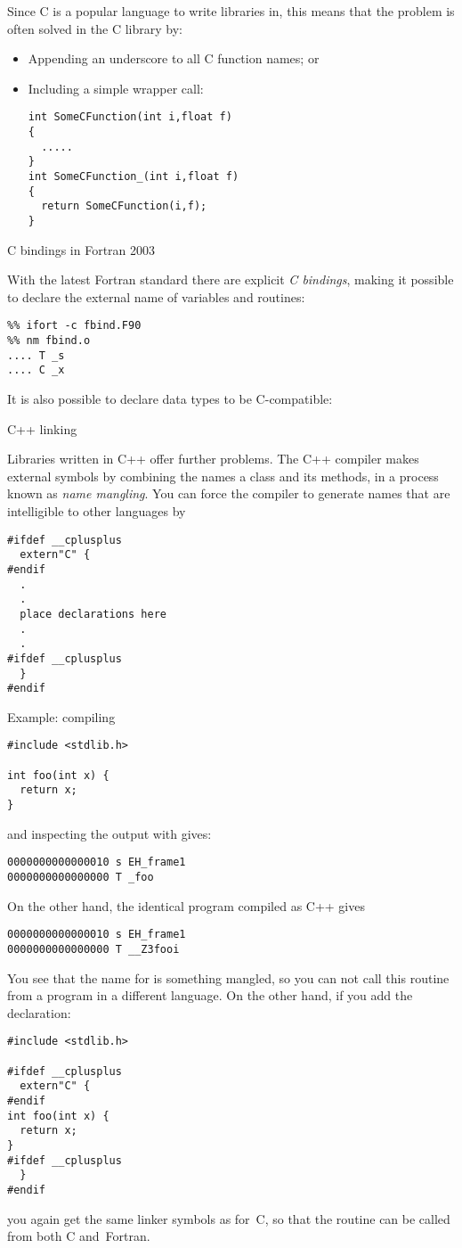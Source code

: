 Since C is a popular language to write libraries in, this means
that the problem is often solved in the C library by:
\begin{itemize}
\item Appending an underscore to all C function names; or
\item Including a simple wrapper call:
\begin{verbatim}
int SomeCFunction(int i,float f)
{
  .....
}
int SomeCFunction_(int i,float f)
{
  return SomeCFunction(i,f);
}
\end{verbatim}
\end{itemize}

 {C bindings in Fortran 2003}
 
With the latest Fortran standard there are explicit
\emph{C bindings},
making
it possible to declare the
external name of variables and routines:

\begin{verbatim}
%% ifort -c fbind.F90
%% nm fbind.o
.... T _s
.... C _x
\end{verbatim}

It is also possible to declare data types to be C-compatible:


 {C++ linking}

Libraries written in C++ offer further problems.
The C++ compiler makes external symbols by combining
the names a class and its methods, in a process known
as \emph{name mangling}.
You can force the compiler to
generate names that are intelligible to other languages by
\begin{verbatim}
#ifdef __cplusplus
  extern"C" {
#endif
  .
  .
  place declarations here
  .
  .
#ifdef __cplusplus
  }
#endif
\end{verbatim}

Example:
compiling
\begin{verbatim}
#include <stdlib.h>

int foo(int x) {
  return x;
}
\end{verbatim}
and inspecting the output with  gives:
\begin{verbatim}
0000000000000010 s EH_frame1
0000000000000000 T _foo
\end{verbatim}
On the other hand, the identical program compiled as C++ gives
\begin{verbatim}
0000000000000010 s EH_frame1
0000000000000000 T __Z3fooi
\end{verbatim}
You see that the name for  is something mangled, so you can not call 
this routine from a program in a different language. On the other hand,
if you add the  declaration:
\begin{verbatim}
#include <stdlib.h>

#ifdef __cplusplus
  extern"C" {
#endif
int foo(int x) {
  return x;
}
#ifdef __cplusplus
  }
#endif
\end{verbatim}
you again get the same linker symbols as for~C, so that the routine
can be called from both C and~Fortran.

